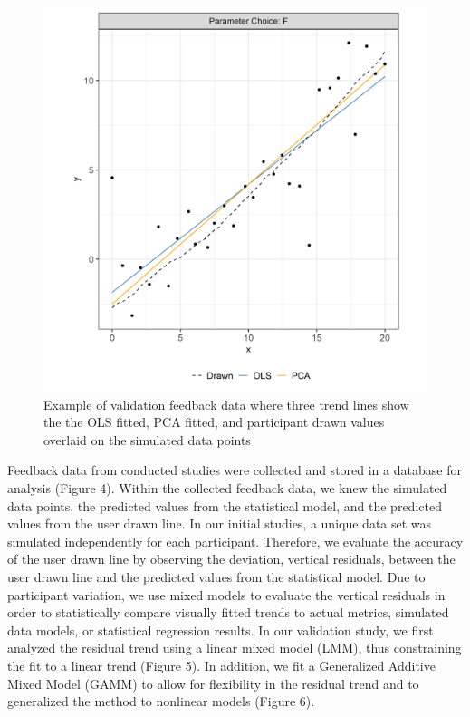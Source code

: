 \documentclass[
  letterpaper,
  DIV=11,
  numbers=noendperiod]{scrartcl}
\begin{document}
\begin{figure}[ht]
\begin{center}
\centerline{\includegraphics[width=\columnwidth]{images/eyefitting-trial-plot}}
\caption{Example of validation feedback data where three trend lines show the the OLS fitted, PCA fitted, and participant drawn values overlaid on the simulated data points}
\label{eyefitting-trial-plot}
\end{center}
\end{figure}

Feedback data from conducted studies were collected and stored in a
database for analysis (Figure 4). Within the collected feedback data, we
knew the simulated data points, the predicted values from the
statistical model, and the predicted values from the user drawn line. In
our initial studies, a unique data set was simulated independently for
each participant. Therefore, we evaluate the accuracy of the user drawn
line by observing the deviation, vertical residuals, between the user
drawn line and the predicted values from the statistical model. Due to
participant variation, we use mixed models to evaluate the vertical
residuals in order to statistically compare visually fitted trends to
actual metrics, simulated data models, or statistical regression
results. In our validation study, we first analyzed the residual trend
using a linear mixed model (LMM), thus constraining the fit to a linear
trend (Figure 5). In addition, we fit a Generalized Additive Mixed Model
(GAMM) to allow for flexibility in the residual trend and to generalized
the method to nonlinear models (Figure 6).
\end{document}
